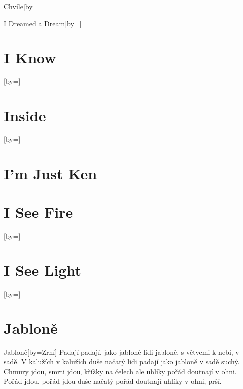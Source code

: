 \documentclass{article}
\begin{document}
\begin{songs}{}
\begin{song}{Chvíle}[by={}]
\beginverse

\endverse
\end{song}


\begin{song}{I Dreamed a Dream}[by={}]
\beginverse

\endverse
\end{song}

\section{I Know}
\begin{song}{}[by={}]
\beginverse

\endverse
\end{song}

\section{Inside}
\begin{song}{}[by={}]
\beginverse

\endverse
\end{song}

\section{I'm Just Ken}

\section{I See Fire}
\begin{song}{}[by={}]
\beginverse

\endverse
\end{song}

\section{I See Light}
\begin{song}{}[by={}]
\beginverse

\endverse
\end{song}

\section{Jabloně}

\begin{song}{Jabloně}[by={Zrní}]
\beginverse
Padají padají, jako jabloně
lidi jabloně, s větvemi k nebi, v sadě.
\endverse
\beginverse
V kalužích v kalužích duše načatý
lidi padají jako jabloně v sadě suchý.
\endverse
\beginverse
Chmury jdou, smrti jdou, křížky na čelech
ale uhlíky pořád doutnají v ohni. 
\endverse
\beginverse
Pořád jdou, pořád jdou duše načatý
pořád doutnají uhlíky v ohni, prší.
\endverse
\end{song}


\end{songs}
\end{document}
